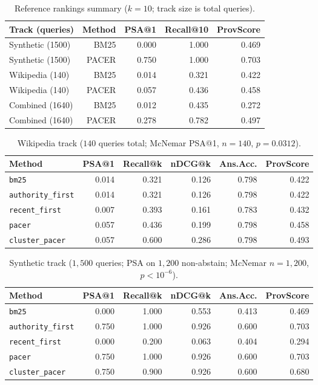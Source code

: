 \documentclass[sigconf]{acmart}
\begin{document}
\begin{table}[t]
  \centering
  \small
  \caption{Reference rankings summary ($k{=}10$; track size is total queries).}
  \label{tab:summary}
  \begin{tabular}{lrrrr}
  \toprule
  Track (queries) & Method & PSA@1 & Recall@10 & ProvScore \\
  \midrule
  Synthetic (1500) & BM25 & 0.000 & 1.000 & 0.469 \\
  Synthetic (1500) & PACER & 0.750 & 1.000 & 0.703 \\
  Wikipedia (140) & BM25 & 0.014 & 0.321 & 0.422 \\
  Wikipedia (140) & PACER & 0.057 & 0.436 & 0.458 \\
  Combined (1640) & BM25 & 0.012 & 0.435 & 0.272 \\
  Combined (1640) & PACER & 0.278 & 0.782 & 0.497 \\
  \bottomrule
  \end{tabular}
\end{table}

\begin{table}[t]
\centering
\small
\setlength{\tabcolsep}{4pt}
\caption{Wikipedia track ($140$ queries total; McNemar PSA@1, $n{=}140$, $p{=}0.0312$).}
\label{tab:eval_wiki}
\begin{tabular}{lrrrrr}
\toprule
Method & PSA@1 & Recall@k & nDCG@k & Ans.Acc. & ProvScore \\
\midrule
\texttt{bm25} & 0.014 & 0.321 & 0.126 & 0.798 & 0.422 \\
\texttt{authority\_first} & 0.014 & 0.321 & 0.126 & 0.798 & 0.422 \\
\texttt{recent\_first} & 0.007 & 0.393 & 0.161 & 0.783 & 0.432 \\
\texttt{pacer} & 0.057 & 0.436 & 0.199 & 0.798 & 0.458 \\
\texttt{cluster\_pacer} & 0.057 & 0.600 & 0.286 & 0.798 & 0.493 \\
\bottomrule
\end{tabular}
\end{table}

\begin{table}[t]
\centering
\small
\caption{Synthetic track ($1{,}500$ queries; PSA on $1{,}200$ non-abstain; McNemar $n{=}1{,}200$, $p{<}10^{-6}$).}
\label{tab:eval_synth}
\begin{tabular}{lrrrrr}
\toprule
Method & PSA@1 & Recall@k & nDCG@k & Ans.Acc. & ProvScore \\
\midrule
\texttt{bm25} & 0.000 & 1.000 & 0.553 & 0.413 & 0.469 \\
\texttt{authority\_first} & 0.750 & 1.000 & 0.926 & 0.600 & 0.703 \\
\texttt{recent\_first} & 0.000 & 0.200 & 0.063 & 0.404 & 0.294 \\
\texttt{pacer} & 0.750 & 1.000 & 0.926 & 0.600 & 0.703 \\
\texttt{cluster\_pacer} & 0.750 & 0.900 & 0.926 & 0.600 & 0.680 \\
\bottomrule
\end{tabular}
\end{table}
\end{document}
